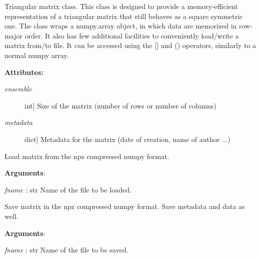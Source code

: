\documentclass[letterpaper,10pt,english]{sphinxmanual}
\begin{document}
\begin{fulllineitems}
\label{index:encore.utils.TriangularMatrix}
Triangular matrix class. This class is designed to provide a memory-efficient representation of a triangular matrix that still behaves as a square symmetric one. The class wraps a numpy.array object, in which data are memorized in row-major order. It also has few additional facilities to conveniently load/write a matrix from/to file. It can be accessed using the {[}{]} and () operators, similarly to a normal numpy array.

\textbf{Attributes:}
\begin{description}
\item[{\emph{ensemble}}] \leavevmode{[}int{]}
Size of the matrix (number of rows or number of columns)

\item[{\emph{metadata}}] \leavevmode{[}dict{]}
Metadata for the matrix (date of creation, name of author ...)

\end{description}

\begin{fulllineitems}
\label{index:encore.utils.TriangularMatrix.loadz}
Load matrix from the npz compressed numpy format.

\textbf{Arguments}:

\emph{fname} : str
Name of the file to be loaded.

\end{fulllineitems}


\begin{fulllineitems}
\label{index:encore.utils.TriangularMatrix.savez}
Save matrix in the npz compressed numpy format. Save metadata and data as well.

\textbf{Arguments}:

\emph{fname} : str
Name of the file to be saved.

\end{fulllineitems}



\end{fulllineitems}
\end{document}

